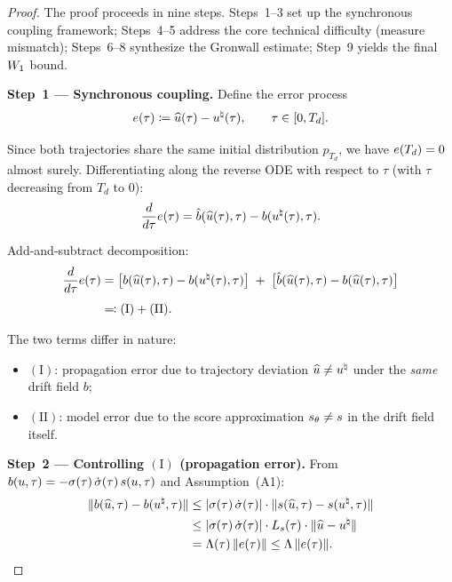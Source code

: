 \begin{proof}
The proof proceeds in nine steps. Steps~1--3 set up the synchronous coupling framework; Steps~4--5 address the core technical difficulty (measure mismatch); Steps~6--8 synthesize the Gronwall estimate; Step~9 yields the final $W_{1}$ bound.

\medskip
\noindent
\textbf{Step~1 --- Synchronous coupling.}
Define the error process
\begin{equation}
e(\tau) \coloneqq \widehat{u}(\tau) - u^{\natural}(\tau), \qquad \tau \in [0, T_{d}].
\label{eq:thm2-step1}
\end{equation}

Since both trajectories share the same initial distribution $p_{T_{d}}$, we have $e(T_{d}) = 0$ almost surely. Differentiating along the reverse ODE with respect to $\tau$ (with $\tau$ decreasing from $T_{d}$ to $0$):
\begin{equation}
\frac{d}{d\tau} e(\tau)
= \hat b(\widehat{u}(\tau), \tau) - b(u^{\natural}(\tau), \tau).
\label{eq:thm2-step1-ode}
\end{equation}

Add-and-subtract decomposition:
\begin{align}
\frac{d}{d\tau} e(\tau)
&= \bigl[b(\widehat{u}(\tau), \tau) - b(u^{\natural}(\tau), \tau)\bigr]
   \;+\;
   \bigl[\hat b(\widehat{u}(\tau), \tau) - b(\widehat{u}(\tau), \tau)\bigr] \notag \\[4pt]
&\eqqcolon (\mathrm{I}) + (\mathrm{II}).
\label{eq:thm2-step1-decomp}
\end{align}

The two terms differ in nature:
\begin{itemize}
\item $(\mathrm{I})$: propagation error due to trajectory deviation $\widehat{u} \neq u^{\natural}$ under the \emph{same} drift field $b$;
\item $(\mathrm{II})$: model error due to the score approximation $s_{\theta} \neq s$ in the drift field itself.
\end{itemize}

\medskip
\noindent
\textbf{Step~2 --- Controlling $(\mathrm{I})$ (propagation error).}
From $b(u, \tau) = -\sigma(\tau)\,\dot\sigma(\tau)\,s(u, \tau)$ and Assumption~(A1):
\begin{align}
\lVert b(\widehat{u}, \tau) - b(u^{\natural}, \tau) \rVert
&\le \lvert \sigma(\tau)\,\dot\sigma(\tau) \rvert \cdot \lVert s(\widehat{u}, \tau) - s(u^{\natural}, \tau) \rVert \notag \\
&\le \lvert \sigma(\tau)\,\dot\sigma(\tau) \rvert \cdot L_{s}(\tau) \cdot \lVert \widehat{u} - u^{\natural} \rVert \notag \\
&= \Lambda(\tau)\,\lVert e(\tau) \rVert
\le \Lambda\,\lVert e(\tau) \rVert.
\label{eq:thm2-step2}
\end{align}


\end{proof}
